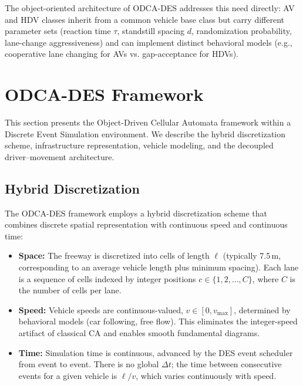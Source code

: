 \documentclass[review,authoryear]{elsarticle}
\begin{document}
The object-oriented architecture of ODCA-DES addresses this need directly: AV and HDV classes inherit from a common vehicle base class but carry different parameter sets (reaction time $\tau$, standstill spacing $d$, randomization probability, lane-change aggressiveness) and can implement distinct behavioral models (e.g., cooperative lane changing for AVs vs. gap-acceptance for HDVs).


\section{ODCA-DES Framework}
\label{sec:framework}

This section presents the Object-Driven Cellular Automata framework within a Discrete Event Simulation environment. We describe the hybrid discretization scheme, infrastructure representation, vehicle modeling, and the decoupled driver--movement architecture.

\subsection{Hybrid Discretization}
\label{sec:discretization}

The ODCA-DES framework employs a hybrid discretization scheme that combines discrete spatial representation with continuous speed and continuous time:

\begin{itemize}
    \item \textbf{Space:} The freeway is discretized into cells of length $\ell$ (typically 7.5\,m, corresponding to an average vehicle length plus minimum spacing). Each lane is a sequence of cells indexed by integer positions $c \in \{1, 2, \ldots, C\}$, where $C$ is the number of cells per lane.

    \item \textbf{Speed:} Vehicle speeds are continuous-valued, $v \in [0, v_{\max}]$, determined by behavioral models (car following, free flow). This eliminates the integer-speed artifact of classical CA and enables smooth fundamental diagrams.

    \item \textbf{Time:} Simulation time is continuous, advanced by the DES event scheduler from event to event. There is no global $\Delta t$; the time between consecutive events for a given vehicle is $\ell / v$, which varies continuously with speed.
\end{itemize}
\end{document}
